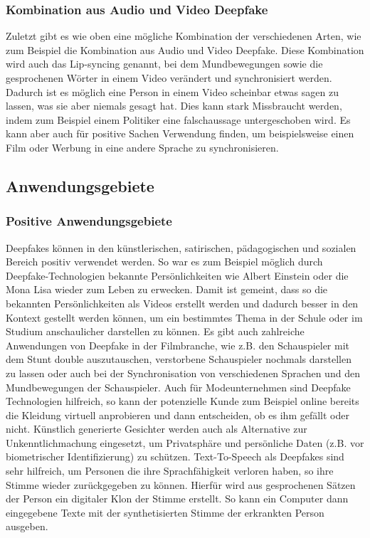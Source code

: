 \subsubsection*{Kombination aus Audio und Video Deepfake}
Zuletzt gibt es wie oben eine mögliche Kombination der verschiedenen Arten, wie zum Beispiel die Kombination aus Audio und Video Deepfake.
Diese Kombination wird auch das Lip-syncing genannt, bei dem Mundbewegungen sowie die gesprochenen Wörter in einem Video verändert und synchronisiert werden.
Dadurch ist es möglich eine Person in einem Video scheinbar etwas sagen zu lassen, was sie aber niemals gesagt hat. Dies kann stark Missbraucht werden, indem zum Beispiel einem Politiker eine falschaussage untergeschoben wird.
Es kann aber auch für positive Sachen Verwendung finden, um beispielsweise einen Film oder Werbung in eine andere Sprache zu synchronisieren.\cite{ResearchGate}

\subsection{Anwendungsgebiete}
\subsubsection*{Positive Anwendungsgebiete}
Deepfakes können in den künstlerischen, satirischen, pädagogischen und sozialen Bereich positiv verwendet werden.\newline
So war es zum Beispiel möglich durch Deepfake-Technologien bekannte Persönlichkeiten wie Albert Einstein oder die Mona Lisa wieder zum Leben zu erwecken. Damit ist gemeint, dass so die bekannten Persönlichkeiten als Videos erstellt werden und dadurch besser in den Kontext gestellt werden können, um ein bestimmtes Thema in der Schule oder im Studium anschaulicher darstellen zu können.\newline
Es gibt auch zahlreiche Anwendungen von Deepfake in der Filmbranche, wie z.B. den Schauspieler mit dem Stunt double auszutauschen, verstorbene Schauspieler nochmals darstellen zu lassen oder auch bei der Synchronisation von verschiedenen Sprachen und den Mundbewegungen der Schauspieler.
Auch für Modeunternehmen sind Deepfake Technologien hilfreich, so kann der potenzielle Kunde zum Beispiel online bereits die Kleidung virtuell anprobieren und dann entscheiden, ob es ihm gefällt oder nicht.\newline
Künstlich generierte Gesichter werden auch als Alternative zur Unkenntlichmachung eingesetzt, um Privatsphäre und persönliche Daten (z.B. vor biometrischer Identifizierung) zu schützen.\newline
Text-To-Speech als Deepfakes sind sehr hilfreich, um Personen die ihre Sprachfähigkeit verloren haben, so ihre Stimme wieder zurückgegeben zu können. Hierfür wird aus gesprochenen Sätzen der Person ein digitaler Klon der Stimme erstellt. So kann ein Computer dann eingegebene Texte mit der synthetisierten Stimme der erkrankten Person ausgeben.\cite{SpringerLink}

